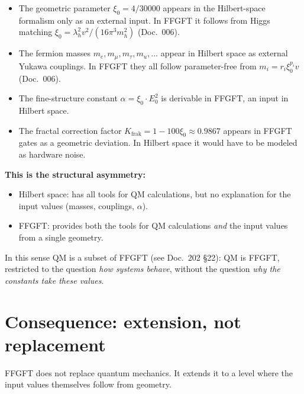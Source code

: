 \begin{itemize}[leftmargin=2em,itemsep=2pt,topsep=2pt]
  \item The geometric parameter $\xi_0 = 4/30000$ appears in the
        Hilbert-space formalism only as an external input. In FFGFT
        it follows from Higgs matching $\xi_0 = \lambda_h^2 v^2/
        (16\pi^3 m_h^2)$ (Doc.~006).
  \item The fermion masses $m_e, m_\mu, m_\tau, m_u, \ldots$ appear
        in Hilbert space as external Yukawa couplings. In FFGFT they
        all follow parameter-free from $m_i = r_i \xi_0^{p_i} v$
        (Doc.~006).
  \item The fine-structure constant $\alpha = \xi_0 \cdot E_0^2$ is
        derivable in FFGFT, an input in Hilbert space.
  \item The fractal correction factor $K_{\text{frak}} = 1 -
        100\xi_0 \approx 0.9867$ appears in FFGFT gates as a
        geometric deviation. In Hilbert space it would have to be
        modeled as hardware noise.
\end{itemize}

\textbf{This is the structural asymmetry:}
\begin{itemize}[leftmargin=2em,itemsep=2pt,topsep=2pt]
  \item Hilbert space: has all tools for QM calculations, but no
        explanation for the input values (masses, couplings,
        $\alpha$).
  \item FFGFT: provides both the tools for QM calculations
        \emph{and} the input values from a single geometry.
\end{itemize}

In this sense QM is a subset of FFGFT (see Doc.~202 §22): QM is
FFGFT, restricted to the question \emph{how systems behave}, without
the question \emph{why the constants take these values}.

\section{Consequence: extension, not replacement}

FFGFT does not replace quantum mechanics. It extends it to a level
where the input values themselves follow from geometry.

